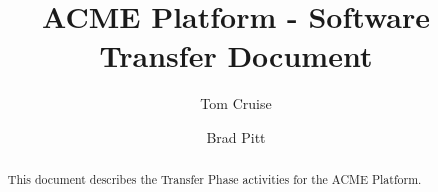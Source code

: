 \documentclass[a4paper]{article}
\begin{document}
 

\title{ACME Platform - Software Transfer Document}
\author{Tom Cruise}
\author{Brad Pitt}
\renewcommand\Authands{ and }

\maketitle

\begin{abstract}
This document describes the Transfer Phase activities for the ACME Platform.\end{abstract}

\pagebreak
\tableofcontents

\pagebreak

\pagebreak

\pagebreak

\pagebreak

\pagebreak

\pagebreak

\pagebreak

\pagebreak

\end{document}
